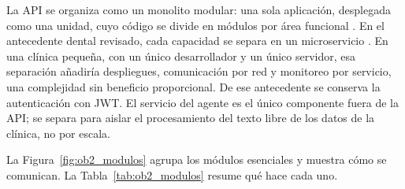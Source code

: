 La API se organiza como un monolito modular: una sola aplicación, desplegada como una unidad, cuyo código se divide en módulos por área funcional \cite{richards2020fundamentals}. En el antecedente dental revisado, cada capacidad se separa en un microservicio \cite{arcila2022microservice}. En una clínica pequeña, con un único desarrollador y un único servidor, esa separación añadiría despliegues, comunicación por red y monitoreo por servicio, una complejidad sin beneficio proporcional. De ese antecedente se conserva la autenticación con JWT. El servicio del agente es el único componente fuera de la API; se separa para aislar el procesamiento del texto libre de los datos de la clínica, no por escala.

La Figura~\ref{fig:ob2_modulos} agrupa los módulos esenciales y muestra cómo se comunican. La Tabla~\ref{tab:ob2_modulos} resume qué hace cada uno.

